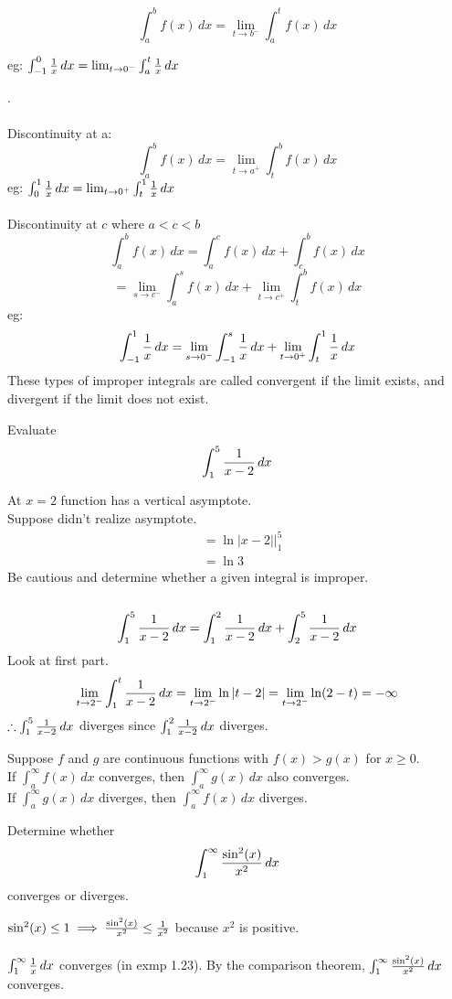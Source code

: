 \documentclass[english, 12pt]{article}
\begin{document}
\[ \int_a^b f(x)\,dx = \lim_{t \to b^-} \int_a^t f(x)\,dx \]
\begin{center}
eg: $\int_{-1}^0 \frac{1}{x}\,dx = \lim_{t \to 0^-} \int_a^t \frac{1}{x} \,dx$
\end{center}
.\\\\
Discontinuity at a:
\[ \int_a^b f(x)\,dx = \lim_{t \to a^+} \int_t^b f(x)\,dx \]
eg: $\int_{0}^1 \frac{1}{x}\,dx = \lim_{t \to 0^+} \int_t^1 \frac{1}{x} \,dx$\\\\
Discontinuity at $c$ where $a < c < b$
\[\int_a^b f(x)\,dx = \int_a^c f(x)\,dx + \int_c^b f(x)\,dx \]
\[= \lim_{s \to c^-} \int_a^s f(x)\,dx + 
\lim_{t \to c^+} \int_t^b f(x)\,dx \]
eg: \[\int_{-1}^1 \frac{1}{x}\,dx = 
\lim_{s \to 0^-} \int_{-1}^s \frac{1}{x} \,dx +
 \lim_{t \to 0^+} \int_t^1 \frac{1}{x} \,dx\]
These types of improper integrals are called convergent if the limit exists, and divergent if the limit does not exist.
\begin{exmp}
Evaluate 
\[ \int_1^5 \frac{1}{x-2}\,dx \]
\begin{sol}
At $x=2$ function has a vertical asymptote.\\
Suppose didn't realize asymptote.
\begin{align*}
& = \ln | x - 2 |\Big|_1^5\\
& = \ln 3 
\end{align*}
Be cautious and determine whether a given integral is improper.\\\\
\[\int_1^5 \frac{1}{x-2}\,dx = \int_1^2 \frac{1}{x-2}\,dx + \int_2^5 \frac{1}{x-2}\,dx\]
Look at first part.
\[\lim_{t \to 2^-} \int_1^t \frac{1}{x-2}\,dx = \lim_{t \to 2^-} \ln |t - 2| = \lim_{t \to 2^-} \ln (2-t)= - \infty\]
$\therefore \int_1^5 \frac{1}{x-2}\,dx$ diverges since $\int_1^2 \frac{1}{x-2}\,dx$ diverges.
\end{sol}
\end{exmp}
\begin{thrm}
Suppose $f$ and $g$ are continuous functions with $f(x) > g(x)$ for $x \geq 0$. \\
If $\int_a^{\infty} f(x)\,dx$ converges, then $\int_a^\infty g(x)\,dx$ also converges.\\
If $\int_a^\infty g(x)\,dx$ diverges, then $\int_a^\infty f(x)\,dx$ diverges.
\end{thrm}

\begin{exmp}
Determine whether 
\[ \int_1^\infty \frac{\sin^2(x)}{x^2}\,dx \] 
converges or diverges.
\begin{sol}
$\sin^2(x) \leq 1 \implies \frac{\sin^2(x)}{x^2} \leq \frac{1}{x^2}$ because $x^2$ is positive.\\\\ 
$\int_1^\infty \frac{1}{x}\,dx$ converges (in exmp 1.23). By the comparison theorem, $\int_1^\infty \frac{\sin^2(x)}{x^2}\,dx$ converges.
\end{sol}
\end{exmp}
\end{document}

